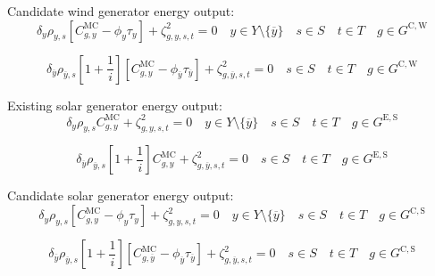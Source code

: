 \documentclass{article}
\newcommand{\sGeneratorsExistingSolar}{G^{\mathrm{E,S}}}
\newcommand{\sGeneratorsCandidateWind}{G^{\mathrm{C,W}}}
\newcommand{\sGeneratorsCandidateSolar}{G^{\mathrm{C,S}}}
\newcommand{\sYears}{Y}
\newcommand{\sScenarios}{S}
\newcommand{\sIntervals}{T}
\newcommand{\iGenerator}{g}
\newcommand{\iYear}{y}
\newcommand{\iYearTerminal}{\overline{\iYear}}
\newcommand{\iScenario}{s}
\newcommand{\iInterval}{t}
\newcommand{\cScenarioDuration}[1][\iYear,\iScenario]{\rho_{#1}}
\newcommand{\cMarginalCost}[1][\iGenerator,\iYear]{C^{\mathrm{MC}}_{#1}}
\newcommand{\cInterestRate}{i}
\newcommand{\cDiscountRate}[1][\iYear]{\delta_{#1}}
\newcommand{\vBaseline}[1][\iYear]{\phi_{#1}}
\newcommand{\vPermitPrice}[1][\iYear]{\tau_{#1}}
\newcommand{\dGeneratorEnergyOutput}[1][\iGenerator,\iYear,\iScenario,\iInterval]{\zeta_{#1}^{2}}
\begin{document}
Candidate wind generator energy output:
\begin{equation}
\cDiscountRate\cScenarioDuration \left[\cMarginalCost - \vBaseline\vPermitPrice \right] + \dGeneratorEnergyOutput = 0 \quad \iYear \in \sYears \setminus \{\iYearTerminal\} \quad \iScenario \in \sScenarios \quad \iInterval \in \sIntervals \quad \iGenerator \in \sGeneratorsCandidateWind
\end{equation}

\begin{equation}
\cDiscountRate[\iYearTerminal] \cScenarioDuration[\iYearTerminal,\iScenario] \left[1 + \frac{1}{\cInterestRate}\right] \left[\cMarginalCost - \vBaseline[\iYearTerminal]\vPermitPrice[\iYearTerminal] \right] + \dGeneratorEnergyOutput[\iGenerator,\iYearTerminal,\iScenario,\iInterval] = 0 \quad \iScenario \in \sScenarios \quad \iInterval \in \sIntervals  \quad \iGenerator \in \sGeneratorsCandidateWind
\end{equation}

Existing solar generator energy output:
\begin{equation}
\cDiscountRate\cScenarioDuration \cMarginalCost + \dGeneratorEnergyOutput = 0 \quad \iYear \in \sYears \setminus \{\iYearTerminal\} \quad \iScenario \in \sScenarios \quad \iInterval \in \sIntervals \quad \iGenerator \in \sGeneratorsExistingSolar
\end{equation}

\begin{equation}
\cDiscountRate[\iYearTerminal] \cScenarioDuration[\iYearTerminal,\iScenario] \left[1 + \frac{1}{\cInterestRate}\right] \cMarginalCost + \dGeneratorEnergyOutput[\iGenerator,\iYearTerminal,\iScenario,\iInterval] = 0 \quad \iScenario \in \sScenarios \quad \iInterval \in \sIntervals \quad \iGenerator \in \sGeneratorsExistingSolar
\end{equation}

Candidate solar generator energy output:
\begin{equation}
\cDiscountRate\cScenarioDuration \left[\cMarginalCost - \vBaseline\vPermitPrice \right] + \dGeneratorEnergyOutput = 0 \quad \iYear \in \sYears \setminus \{\iYearTerminal\} \quad \iScenario \in \sScenarios \quad \iInterval \in \sIntervals \quad \iGenerator \in \sGeneratorsCandidateSolar
\end{equation}

\begin{equation}
\cDiscountRate[\iYearTerminal] \cScenarioDuration[\iYearTerminal,\iScenario] \left[1 + \frac{1}{\cInterestRate}\right] \left[\cMarginalCost[\iGenerator,\iYearTerminal]  - \vBaseline[\iYearTerminal]\vPermitPrice[\iYearTerminal] \right] + \dGeneratorEnergyOutput[\iGenerator,\iYearTerminal,\iScenario,\iInterval] = 0 \quad \iScenario \in \sScenarios \quad \iInterval \in \sIntervals  \quad \iGenerator \in \sGeneratorsCandidateSolar
\end{equation}
\end{document}
